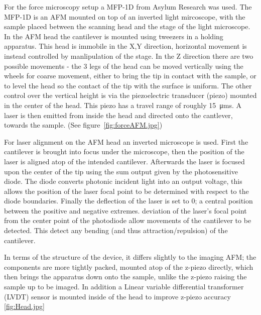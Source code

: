 For the force microscopy setup a MFP-1D from Asylum Research was used. The MFP-1D is an AFM mounted on top of an inverted light mircoscope, with the sample placed between the scanning head and the stage of the light microscope. In the AFM head the cantilever is mounted using tweezers in a holding apparatus. This head is immobile in the X,Y direction, horizontal movement is instead controlled by manlipulation of the stage. In the Z direction there are two possible movements - the 3 legs of the head can be moved vertically using the wheels for coarse movement, either to bring the tip in contact with the sample, or to level the head so the contact of the tip with the surface is uniform. The other control over the vertical height is via the piezoelectric transducer (piezo) mounted in the center of the head. This piezo has a travel range of roughly \SI{15}{\micro\metre}s. A laser is then emitted from inside the head and directed onto the cantlever, towards the sample. (See figure~\ref{fig:forceAFM.jpg})

For laser alignment on the AFM head an inverted microscope is used. First the cantilever is brought into focus under the microscope, then the position of the laser is aligned atop of the intended cantilever. Afterwards the laser is focused upon the center of the tip using the sum output given by the photosensitive diode. The diode converts photonic incident light into an output voltage, this allows the position of the laser focal point to be determined with respect to the diode boundaries.  Finally the deflection of the laser is set to 0; a central position between the positive and negative extremes. deviation of the laser's focal point from the center point of the photodiode allow movements of the cantilever to be detected. This  detect any bending (and thus attraction/repulsion) of the cantilever. 

In terms of the structure of the device, it differs slightly to the imaging AFM; the components are more tightly packed, mounted atop of the z-piezo directly, which then brings the apparatus down onto the sample, unlike the z-piezo raising the sample up to be imaged. In addition a Linear variable differential transformer (LVDT) sensor is mounted inside of the head to improve z-piezo accuracy \ref{fig:Head.jpg}

